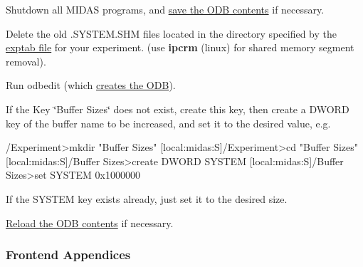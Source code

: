 \begin{DoxyEnumerate}
\item Shutdown all MIDAS programs, and \hyperlink{RC_odbedit_examples_RC_odbedit_save}{save the ODB contents} if necessary.
\item Delete the old .SYSTEM.SHM files located in the directory specified by the \hyperlink{Q_Linux_Q_Linux_Exptab}{exptab file} for your experiment. (use {\bfseries ipcrm} (linux) for shared memory segment removal).
\item Run odbedit (which \hyperlink{RC_odbedit_examples_RC_odbedit_create_ODB}{creates the ODB}). 

\end{DoxyEnumerate}


\begin{DoxyItemize}
\item If the Key \char`\"{}Buffer Sizes\char`\"{} does not exist, create this key, then create a DWORD key of the buffer name to be increased, and set it to the desired value, e.g. 
\begin{DoxyCode}
/Experiment>mkdir "Buffer Sizes"
[local:midas:S]/Experiment>cd "Buffer Sizes"
[local:midas:S]/Buffer Sizes>create DWORD SYSTEM
[local:midas:S]/Buffer Sizes>set SYSTEM 0x1000000
\end{DoxyCode}

\item If the SYSTEM key exists already, just set it to the desired size.
\end{DoxyItemize}


\begin{DoxyEnumerate}
\item \hyperlink{RC_odbedit_examples_RC_odbedit_load}{Reload the ODB contents} if necessary.
\end{DoxyEnumerate}

\par


\par
 

\label{index_end}
\hypertarget{index_end}{}
 \subsubsection{Frontend Appendices}\label{FE_Appendices}
\par


